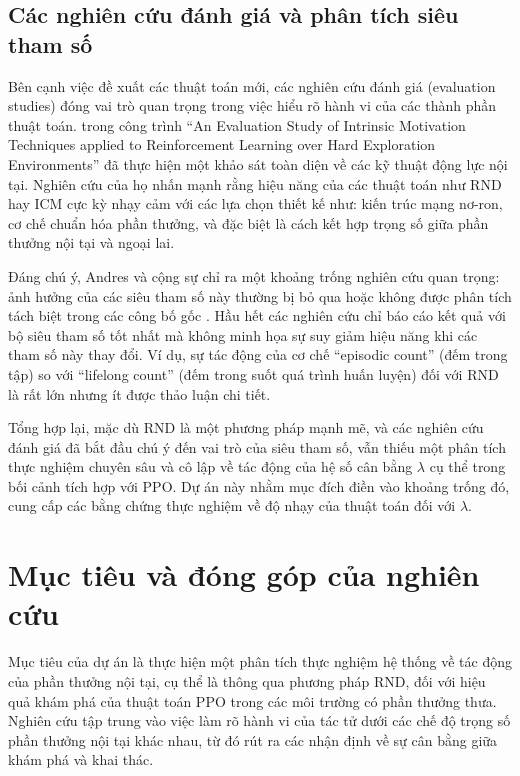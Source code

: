 \documentclass{uetgraduation}
\begin{document}
\subsection{Các nghiên cứu đánh giá và phân tích siêu tham số}

Bên cạnh việc đề xuất các thuật toán mới, các nghiên cứu đánh giá (evaluation studies) đóng vai trò quan trọng trong việc hiểu rõ hành vi của các thành phần thuật toán. \cite{andres2022} trong công trình ``An Evaluation Study of Intrinsic Motivation Techniques applied to Reinforcement Learning over Hard Exploration Environments'' đã thực hiện một khảo sát toàn diện về các kỹ thuật động lực nội tại. Nghiên cứu của họ nhấn mạnh rằng hiệu năng của các thuật toán như RND hay ICM cực kỳ nhạy cảm với các lựa chọn thiết kế như: kiến trúc mạng nơ-ron, cơ chế chuẩn hóa phần thưởng, và đặc biệt là cách kết hợp trọng số giữa phần thưởng nội tại và ngoại lai.

Đáng chú ý, Andres và cộng sự chỉ ra một khoảng trống nghiên cứu quan trọng: ảnh hưởng của các siêu tham số này thường bị bỏ qua hoặc không được phân tích tách biệt trong các công bố gốc \cite{andres2022}. Hầu hết các nghiên cứu chỉ báo cáo kết quả với bộ siêu tham số tốt nhất mà không minh họa sự suy giảm hiệu năng khi các tham số này thay đổi. Ví dụ, sự tác động của cơ chế ``episodic count'' (đếm trong tập) so với ``lifelong count'' (đếm trong suốt quá trình huấn luyện) đối với RND là rất lớn nhưng ít được thảo luận chi tiết.

Tổng hợp lại, mặc dù RND là một phương pháp mạnh mẽ, và các nghiên cứu đánh giá đã bắt đầu chú ý đến vai trò của siêu tham số, vẫn thiếu một phân tích thực nghiệm chuyên sâu và cô lập về tác động của hệ số cân bằng $\lambda$ cụ thể trong bối cảnh tích hợp với PPO. Dự án này nhằm mục đích điền vào khoảng trống đó, cung cấp các bằng chứng thực nghiệm về độ nhạy của thuật toán đối với $\lambda$.

\section{Mục tiêu và đóng góp của nghiên cứu}

Mục tiêu của dự án là thực hiện một phân tích thực nghiệm hệ thống về tác động của phần thưởng nội tại, cụ thể là thông qua phương pháp RND, đối với hiệu quả khám phá của thuật toán PPO trong các môi trường có phần thưởng thưa. Nghiên cứu tập trung vào việc làm rõ hành vi của tác tử dưới các chế độ trọng số phần thưởng nội tại khác nhau, từ đó rút ra các nhận định về sự cân bằng giữa khám phá và khai thác.
\end{document}
